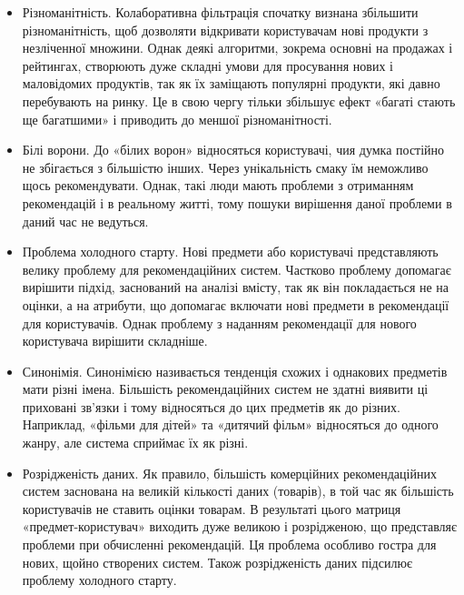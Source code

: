 \begin{itemize}
    \item Різноманітність.
          Колаборативна фільтрація спочатку визнана збільшити різноманітність, щоб дозволяти відкривати користувачам нові продукти з незліченної множини. Однак деякі алгоритми, зокрема основні на продажах і рейтингах, створюють дуже складні умови для просування нових і маловідомих продуктів, так як їх заміщають популярні продукти, які давно перебувають на ринку. Це в свою чергу тільки збільшує ефект «багаті стають ще багатшими» і приводить до меншої різноманітності.

    \item Білі ворони.
          До «білих ворон» відносяться користувачі, чия думка постійно не збігається з більшістю інших. Через унікальність смаку їм неможливо щось рекомендувати. Однак, такі люди мають проблеми з отриманням рекомендацій і в реальному житті, тому пошуки вирішення даної проблеми в даний час не ведуться.

    \item Проблема холодного старту.
          Нові предмети або користувачі представляють велику проблему для рекомендаційних систем. Частково проблему допомагає вирішити підхід, заснований на аналізі вмісту, так як він покладається не на оцінки, а на атрибути, що допомагає включати нові предмети в рекомендації для користувачів. Однак проблему з наданням рекомендації для нового користувача вирішити складніше.

    \item Синонімія.
          Синонімією називається тенденція схожих і однакових предметів мати різні імена. Більшість рекомендаційних систем не здатні виявити ці приховані зв'язки і тому відносяться до цих предметів як до різних. Наприклад, «фільми для дітей» та «дитячий фільм» відносяться до одного жанру, але система сприймає їх як різні.

    \item Розрідженість даних.
          Як правило, більшість комерційних рекомендаційних систем заснована на великій кількості даних (товарів), в той час як більшість користувачів не ставить оцінки товарам. В результаті цього матриця «предмет-користувач» виходить дуже великою і розрідженою, що представляє проблеми при обчисленні рекомендацій. Ця проблема особливо гостра для нових, щойно створених систем. Також розрідженість даних підсилює проблему холодного старту.
\end{itemize}


